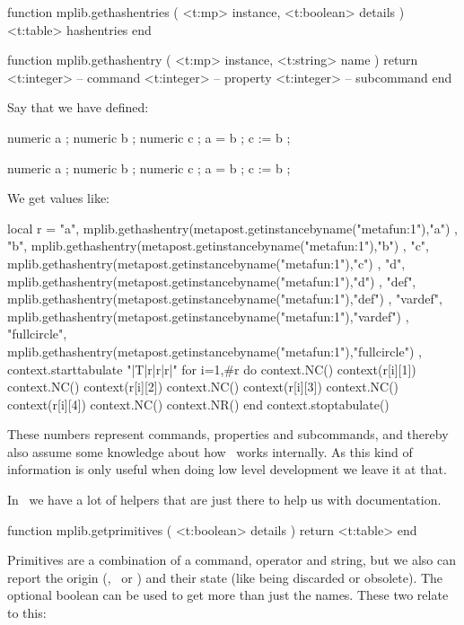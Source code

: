 \starttyping[option=LUA]
function mplib.gethashentries ( <t:mp> instance, <t:boolean> details )
    <t:table> hashentries
end
\stoptyping

\starttyping[option=LUA]
function mplib.gethashentry ( <t:mp> instance, <t:string> name )
    return
        <t:integer> -- command
        <t:integer> -- property
        <t:integer> -- subcommand
end
\stoptyping

Say that we have defined:

\starttyping[option=MP]
numeric a ; numeric b ; numeric c ; a = b ; c := b ;
\stoptyping

\startMPcalculation
    numeric a ; numeric b ; numeric c ; a = b ; c := b ;
\stopMPcalculation

We get values like:

\startluacode
local r = {
    { "a",          mplib.gethashentry(metapost.getinstancebyname("metafun:1"),"a") },
    { "b",          mplib.gethashentry(metapost.getinstancebyname("metafun:1"),"b") },
    { "c",          mplib.gethashentry(metapost.getinstancebyname("metafun:1"),"c") },
    { "d",          mplib.gethashentry(metapost.getinstancebyname("metafun:1"),"d") },
    { "def",        mplib.gethashentry(metapost.getinstancebyname("metafun:1"),"def") },
    { "vardef",     mplib.gethashentry(metapost.getinstancebyname("metafun:1"),"vardef") },
    { "fullcircle", mplib.gethashentry(metapost.getinstancebyname("metafun:1"),"fullcircle") },
}
context.starttabulate { "|T|r|r|r|" }
for i=1,#r do
    context.NC() context(r[i][1])
    context.NC() context(r[i][2])
    context.NC() context(r[i][3])
    context.NC() context(r[i][4])
    context.NC() context.NR()
end
context.stoptabulate()
\stopluacode

These numbers represent commands, properties and subcommands, and thereby also
assume some knowledge about how \METAPOST\ works internally. As this kind of
information is only useful when doing low level development we leave it at that.

In \LUAMETATEX\ we have a lot of helpers that are just there to help us with
documentation.

\starttyping[option=LUA]
function mplib.getprimitives (
    <t:boolean> details
)
    return <t:table>
end
\stoptyping

Primitives are a combination of a command, operator and string, but we also can
report the origin (\METAPOST, \LUATEX\ or \LUAMETATEX) and their state (like
being discarded or obsolete). The optional boolean can be used to get more than
just the names. These two relate to this:

